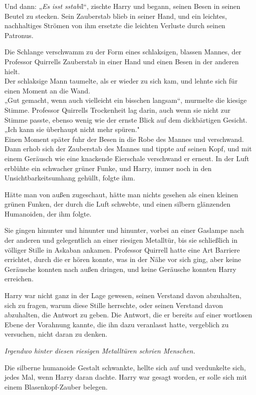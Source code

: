 {Und dann: „\emph{Es isst sstabi}l“, zischte Harry und begann, seinen Besen in seinen Beutel zu stecken. Sein Zauberstab blieb in seiner Hand, und ein leichtes, nachhaltiges Strömen von ihm ersetzte die leichten Verluste durch seinen Patronus.

Die Schlange verschwamm zu der Form eines schlaksigen, blassen Mannes, der Professor Quirrells Zauberstab in einer Hand und einen Besen in der anderen hielt.\\ Der schlaksige Mann taumelte, als er wieder zu sich kam, und lehnte sich für einen Moment an die Wand.\\ „Gut gemacht, wenn auch vielleicht ein bisschen langsam“, murmelte die kiesige Stimme. Professor Quirrells Trockenheit lag darin, auch wenn sie nicht zur Stimme passte, ebenso wenig wie der ernste Blick auf dem dickbärtigen Gesicht.\\ „Ich kann sie überhaupt nicht mehr spüren."\\ Einen Moment später fuhr der Besen in die Robe des Mannes und verschwand.\\ Dann erhob sich der Zauberstab des Mannes und tippte auf seinen Kopf, und mit einem Geräusch wie eine knackende Eierschale verschwand er erneut. In der Luft erblühte ein schwacher grüner Funke, und Harry, immer noch in den Unsichtbarkeitsumhang gehüllt, folgte ihm.

Hätte man von außen zugeschaut, hätte man nichts gesehen als einen kleinen grünen Funken, der durch die Luft schwebte, und einen silbern glänzenden Humanoiden, der ihm folgte.

Sie gingen hinunter und hinunter und hinunter, vorbei an einer Gaslampe nach der anderen und gelegentlich an einer riesigen Metalltür, bis sie schließlich in völliger Stille in Askaban ankamen. Professor Quirrell hatte eine Art Barriere errichtet, durch die er hören konnte, was in der Nähe vor sich ging, aber keine Geräusche konnten nach außen dringen, und keine Geräusche konnten Harry erreichen.

Harry war nicht ganz in der Lage gewesen, seinen Verstand davon abzuhalten, sich zu fragen, warum diese Stille herrschte, oder seinen Verstand davon abzuhalten, die Antwort zu geben. Die Antwort, die er bereits auf einer wortlosen Ebene der Vorahnung kannte, die ihn dazu veranlasst hatte, vergeblich zu versuchen, nicht daran zu denken.

\emph{Irgendwo hinter diesen riesigen Metalltüren schrien Menschen.}

Die silberne humanoide Gestalt schwankte, hellte sich auf und verdunkelte sich, jedes Mal, wenn Harry daran dachte. Harry war gesagt worden, er solle sich mit einem Blasenkopf-Zauber belegen.

}
